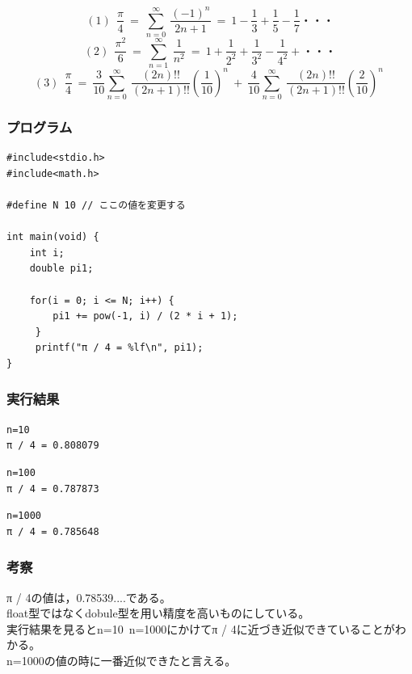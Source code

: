 \documentclass{jarticle}
\begin{document}
\[
(1) \ \ \frac{\pi}{4}\ =\ \sum_{n=0}^{\infty}\ \frac{(-1)^n}{2n+1}\ =\ 1- \frac{1}{3}+\frac{1}{5}-\frac{1}{7}・・・
\]
\[
(2) \ \ \frac{\pi ^2}{6}\ =\ \sum_{n=1}^{\infty}\ \frac{1}{n ^2}\ =\ 1 + \frac{1}{2 ^2}+\frac{1}{3 ^2}-\frac{1}{4 ^2}+・・・
\]
\[
(3) \ \ \frac{\pi}{4}\ =\ \frac{3}{10}\sum_{n=0}^{\infty}\ \frac{(2n)!!}{(2n+1)!!}\left( \frac{1}{10} \right) ^n\ 
+\ \frac{4}{10}\sum_{n=0}^{\infty}\ \frac{(2n)!!}{(2n+1)!!}\left( \frac{2}{10} \right) ^n\ 
\]
\subsubsection{プログラム\\}
\begin{breakbox}
\begin{verbatim}
#include<stdio.h>
#include<math.h>

#define N 10 // ここの値を変更する

int main(void) { 
    int i;
    double pi1;

    for(i = 0; i <= N; i++) {
        pi1 += pow(-1, i) / (2 * i + 1);
     }
     printf("π / 4 = %lf\n", pi1);
}
\end{verbatim}
\end{breakbox}
\subsubsection{実行結果\\}
\begin{breakbox}
\begin{verbatim}
n=10
π / 4 = 0.808079
\end{verbatim}
\end{breakbox}
\begin{breakbox}
\begin{verbatim}
n=100
π / 4 = 0.787873
\end{verbatim}
\end{breakbox}

\begin{breakbox}
\begin{verbatim}
n=1000
π / 4 = 0.785648
\end{verbatim}
\end{breakbox}
\subsubsection{考察\\}
π / 4の値は，0.78539....である。\\
float型ではなくdobule型を用い精度を高いものにしている。\\
実行結果を見るとn=10~n=1000にかけてπ / 4に近づき近似できていることがわかる。\\
n=1000の値の時に一番近似できたと言える。\\
\end{document}
